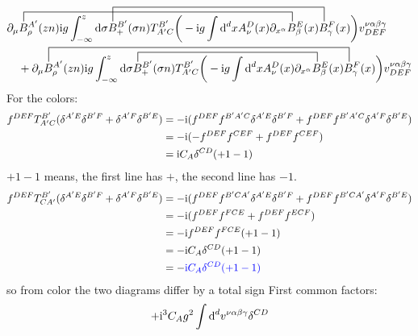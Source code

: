 {\color{blue}
\begin{align}
&\contraction[2ex]{\partial_\mu}{B}{^{A'}_\rho(zn) \imag g \int _{-\infty}^{z} \dx \sigma B_+^{B'}(\sigma n) T^{B'}_{A'C}\bigg(-\imag g \int \ddx xA_\nu^D(x) \partial_{x^\alpha}}{B}
\contraction[3ex]{\partial_\mu B^{A'}_\rho (zn) \imag g \int _{-\infty}^{z} \dx \sigma}{B}{_+^{B'}(\sigma n) T^{B'}_{A'C}\bigg(-\imag g \int \ddx xA_\nu^D(x) \partial_{x^\alpha} B_\beta^{E} (x) }{B}
\partial_\mu B^{A'}_\rho (zn) \imag g \int _{-\infty}^{z} \dx \sigma B_+^{B'}(\sigma n) T^{B'}_{A'C}\bigg(-\imag g \int \ddx xA_\nu^D(x) \partial_{x^\alpha} B_\beta^{E} (x) B_\gamma^F(x) \bigg) v^{\nu \alpha\beta\gamma}_{DEF}
\nl
+\contraction[3ex]{\partial_\mu}{B}{^{A'}_\rho (zn) \imag g \int _{-\infty}^{z} \dx \sigma B_+^{B'}(\sigma n) T^{B'}_{A'C}\bigg(-\imag g \int \ddx xA_\nu^D(x) \partial_{x^\alpha} B_\beta^{E} (x) }{B}
\contraction[2ex]{\partial_\mu B^{A'}_\rho (zn) \imag g \int _{-\infty}^{z} \dx \sigma}{B}{_+^{B'}(\sigma n) T^{B'}_{A'C}\bigg(-\imag g \int \ddx xA_\nu^D(x) \partial_{x^\alpha} }{B}
\partial_\mu B^{A'}_\rho (zn) \imag g \int _{-\infty}^{z} \dx \sigma B_+^{B'}(\sigma n) T^{B'}_{A'C}\bigg(-\imag g \int \ddx xA_\nu^D(x) \partial_{x^\alpha} B_\beta^{E} (x) B_\gamma^F(x) \bigg) v^{\nu \alpha\beta\gamma}_{DEF}
\end{align}
}
For the colors:
{\color{blue}
\begin{align}
f^{DEF} T^{B'}_{A'C}(\delta^{A'E} \delta^{B'F} + \delta^{A'F} \delta^{B'E})
&=
-\text{i}(f^{DEF}f^{B'A'C}\delta^{A'E} \delta^{B'F} + f^{DEF}f^{B'A'C}\delta^{A'F} \delta^{B'E})
\\
&=
-\text{i}(-f^{DEF}f^{CEF} + f^{DEF}f^{CEF})
\\
&=
\text{i} C_A\delta^{CD}(+1 -1)
\end{align}
}
$+1-1$ means, the first line has $+$, the second line has $-1$.
 {\color{red}
\begin{align}
f^{DEF} T^{B'}_{CA'}(\delta^{A'E} \delta^{B'F} + \delta^{A'F} \delta^{B'E})
&=
-\text{i}(f^{DEF}f^{B'CA'}\delta^{A'E} \delta^{B'F} + f^{DEF}f^{B'CA'}\delta^{A'F} \delta^{B'E})
\\
&=
-\text{i}(f^{DEF}f^{FCE} + f^{DEF}f^{ECF})
\\
&=
-\text{i} f^{DEF}f^{FCE}(+1-1)
\\
&=
-\text{i} C_A\delta^{CD}(+1 -1)
\\
&=
-{\color{blue} \text{i} C_A\delta^{CD}(+1 -1)}
\end{align}
}
so from color the two diagrams differ by a total sign
First common factors:
\begin{align}
	+\text{i}^3 C_A g^2 \int \text{d} ^d  v^{\nu \alpha\beta\gamma}\delta^{CD}
\end{align}


